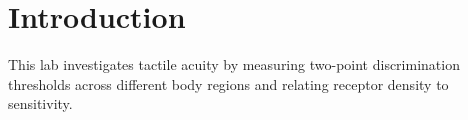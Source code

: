 \section{Introduction}
This lab investigates tactile acuity by measuring two-point discrimination thresholds across different body regions and relating receptor density to sensitivity.
